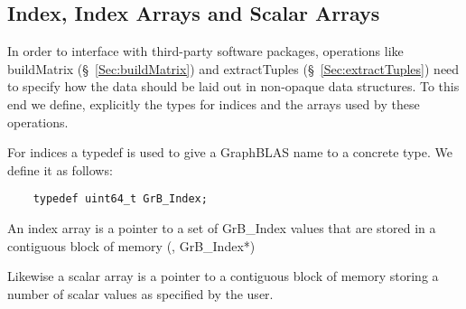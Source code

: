 \subsection{Index, Index Arrays and Scalar Arrays}

In order to interface with third-party software packages, operations like
buildMatrix (\S~\ref{Sec:buildMatrix})
and extractTuples (\S~\ref{Sec:extractTuples}) need to specify how the data should be
laid out in  non-opaque data structures.  To this end we define, explicitly
the types for indices and the arrays used by these operations.

For indices a typedef is used to give a GraphBLAS name to a concrete type. We define it as follows:

\begin{verbatim}
    typedef uint64_t GrB_Index;
\end{verbatim}

An index array is a pointer to a set of {\sf GrB\_Index} values that are stored in a contiguous block of memory (\ie, {\sf GrB\_Index*})

Likewise a scalar array is a pointer to a contiguous block of memory storing a number of scalar values as specified by the user.
